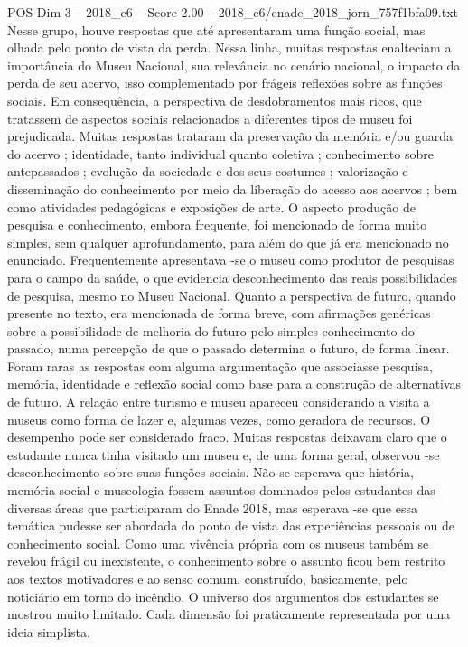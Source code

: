 \begin{textsample}{POS Dim 3 – 2018\_c6 – Score 2.00 – 2018\_c6/enade\_2018\_jorn\_757f1bfa09.txt}
Nesse grupo, houve respostas que até apresentaram uma função social, mas olhada pelo ponto de vista da perda.
Nessa linha, muitas respostas enalteciam a importância do Museu Nacional, sua relevância no cenário nacional, o impacto da perda de seu acervo, isso complementado por frágeis reflexões sobre as funções sociais.
Em consequência, a perspectiva de desdobramentos mais ricos, que tratassem de aspectos sociais relacionados a diferentes tipos de museu foi prejudicada.
Muitas respostas trataram da preservação da memória e/ou guarda do acervo ; identidade, tanto individual quanto coletiva ; conhecimento sobre antepassados ; evolução da sociedade e dos seus costumes ; valorização e disseminação do conhecimento por meio da liberação do acesso aos acervos ; bem como atividades pedagógicas e exposições de arte.
O aspecto produção de pesquisa e conhecimento, embora frequente, foi mencionado de forma muito simples, sem qualquer aprofundamento, para além do que já era mencionado no enunciado.
Frequentemente apresentava -se o museu como produtor de pesquisas para o campo da saúde, o que evidencia desconhecimento das reais possibilidades de pesquisa, mesmo no Museu Nacional.
Quanto a perspectiva de futuro, quando presente no texto, era mencionada de forma breve, com afirmações genéricas sobre a possibilidade de melhoria do futuro pelo simples conhecimento do passado, numa percepção de que o passado determina o futuro, de forma linear.
Foram raras as respostas com alguma argumentação que associasse pesquisa, memória, identidade e reflexão social como base para a construção de alternativas de futuro.
A relação entre turismo e museu apareceu considerando a visita a museus como forma de lazer e, algumas vezes, como geradora de recursos.
O desempenho pode ser considerado fraco.
Muitas respostas deixavam claro que o estudante nunca tinha visitado um museu e, de uma forma geral, observou -se desconhecimento sobre suas funções sociais.
Não se esperava que história, memória social e museologia fossem assuntos dominados pelos estudantes das diversas áreas que participaram do Enade 2018, mas esperava -se que essa temática pudesse ser abordada do ponto de vista das experiências pessoais ou de conhecimento social.
Como uma vivência própria com os museus também se revelou frágil ou inexistente, o conhecimento sobre o assunto ficou bem restrito aos textos motivadores e ao senso comum, construído, basicamente, pelo noticiário em torno do incêndio.
O universo dos argumentos dos estudantes se mostrou muito limitado.
Cada dimensão foi praticamente representada por uma ideia simplista.

\end{textsample}
